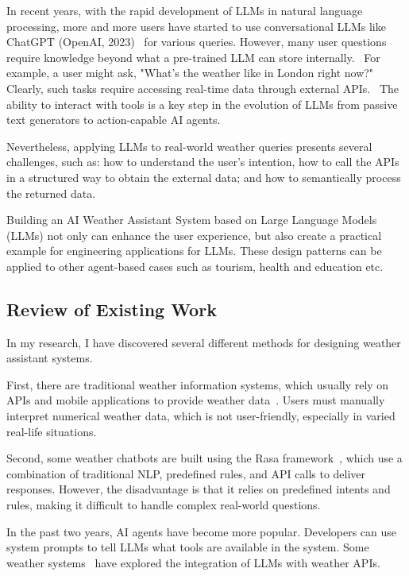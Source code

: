 \documentclass[final-report]{report-template}
\begin{document}
In recent years, with the rapid development of LLMs in natural language processing, more and more users have started to use conversational LLMs like ChatGPT (OpenAI, 2023)~\cite{OpenAI2023} for various queries. However, many user questions require knowledge beyond what a pre-trained LLM can store internally.~\cite{Zhang2023} For example, a user might ask, "What’s the weather like in London right now?" Clearly, such tasks require accessing real-time data through external APIs.~\cite{Chadha2024} The ability to interact with tools is a key step in the evolution of LLMs from passive text generators to action-capable AI agents.

Nevertheless, applying LLMs to real-world weather queries presents several challenges, such as: how to understand the user's intention, how to call the APIs in a structured way to obtain the external data; and how to semantically process the returned data.

Building an AI Weather Assistant System based on Large Language Models (LLMs) not only can enhance the user experience, but also create a practical example for engineering applications for LLMs. These design patterns can be applied to other agent-based cases such as tourism, health and education etc.


\subsection{Review of Existing Work}
In my research, I have discovered several different methods for designing weather assistant systems.

First, there are traditional weather information systems, which usually rely on APIs and mobile applications to provide weather data~\cite{Zhang2023}. Users must manually interpret numerical weather data, which is not user-friendly, especially in varied real-life situations.

Second, some weather chatbots are built using the Rasa framework~\cite{WeatherBot2018}, which use a combination of traditional NLP, predefined rules, and API calls to deliver responses. However, the disadvantage is that it relies on predefined intents and rules, making it difficult to handle complex real-world questions.

In the past two years, AI agents have become more popular. Developers can use system prompts to tell LLMs what tools are available in the system. Some weather systems~\cite{Jeong2024} have explored the integration of LLMs with weather APIs. 
\end{document}
